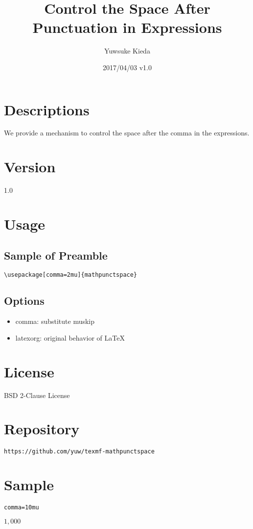 \documentclass{article}
\title{Control the Space After Punctuation in Expressions}
\author{Yuwsuke Kieda}
\date{2017/04/03 v1.0}
\begin{document}
\maketitle

\section{Descriptions}

We provide a mechanism to control the space after the comma in the expressions.

\section{Version}

1.0

\section{Usage}

\subsection{Sample of Preamble}

\begin{verbatim}
\usepackage[comma=2mu]{mathpunctspace}
\end{verbatim}

\subsection{Options}

\begin{itemize}
 \item comma: substitute muskip
 \item latexorg: original behavior of LaTeX
\end{itemize}

\section{License}

BSD 2-Clause License

\section{Repository}

\texttt{https://github.com/yuw/texmf-mathpunctspace}

\section{Sample}

\texttt{comma=10mu}

$1,000$
\end{document}
